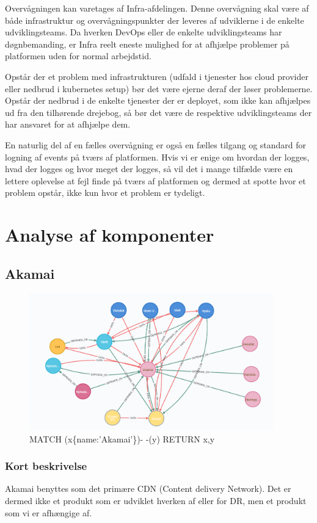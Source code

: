 \documentclass{article}
\begin{document}
Overvågningen kan varetages af Infra-afdelingen. Denne overvågning skal være af både infrastruktur og overvågningspunkter der leveres af udviklerne i de enkelte udviklingsteams. Da hverken DevOps eller de enkelte udviklingsteams har døgnbemanding, er Infra reelt eneste mulighed for at afhjælpe problemer på platformen uden for normal arbejdstid.

Opstår der et problem med infrastrukturen (udfald i tjenester hos cloud provider eller nedbrud i kubernetes setup) bør det være ejerne deraf der løser problemerne. Opstår der nedbrud i de enkelte tjenester der er deployet, som ikke kan afhjælpes ud fra den tilhørende drejebog, så bør det være de respektive udviklingsteams der har ansvaret for at afhjælpe dem.

En naturlig del af en fælles overvågning er også en fælles tilgang og standard for logning af events på tværs af platformen. Hvis vi er enige om hvordan der logges, hvad der logges og hvor meget der logges, så vil det i mange tilfælde være en lettere oplevelse at fejl finde på tværs af platformen og dermed at spotte hvor et problem opstår, ikke kun hvor et problem er tydeligt. 


\section{Analyse af komponenter}

\subsection{Akamai}
\begin{figure}[h]
\includegraphics[width=300pt]{Akamai.PNG}
\caption{MATCH (x\{name:'Akamai'\})- -(y) RETURN x,y}
\end{figure}
\subsubsection*{Kort beskrivelse}
Akamai benyttes som det primære CDN (Content delivery Network). 
Det er dermed ikke et produkt som er udviklet hverken af eller for DR, 
men et produkt som vi er afhængige af. 
\end{document}
